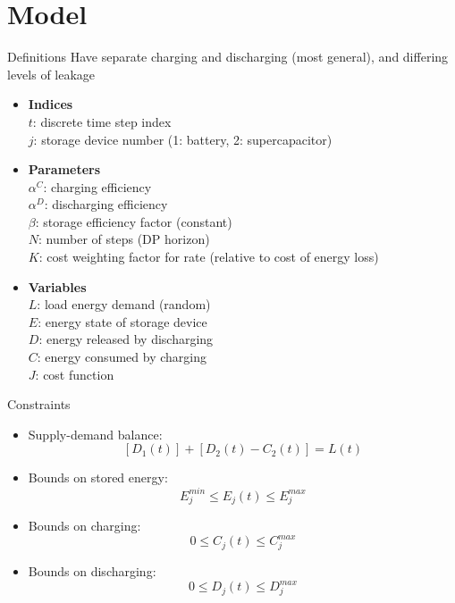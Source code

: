 \documentclass{beamer}
\begin{document}
\section{Model}

\begin{frame}{Definitions}
Have separate charging and discharging (most general), and differing levels of leakage
\begin{itemize}
	\item \textbf{Indices}\\
	$t$: discrete time step index\\
	$j$: storage device number (1: battery, 2: supercapacitor)\\
	\item \textbf{Parameters}\\
	$\alpha^{C}$: charging efficiency\\
	$\alpha^{D}$: discharging efficiency\\
	$\beta$: storage efficiency factor (constant)\\
	$N$: number of steps (DP horizon)\\
	$K$: cost weighting factor for rate (relative to cost of energy loss)\\
	\item \textbf{Variables}\\
	$L$: load energy demand (random)\\
	$E$: energy state of storage device\\
	$D$: energy released by discharging\\
	$C$: energy consumed by charging\\
	$J$: cost function

\end{itemize}
\end{frame}

\begin{frame}{Constraints}
\begin{itemize}
	\item Supply-demand balance: 
	\begin{equation} \label{eq:BalanceEqn}\left[D_{1}(t)\right] + \left[D_{2}(t) - C_{2}(t)\right] = L(t) \end{equation}
	
	\item Bounds on stored energy: 
	\begin{equation}E_{j}^{min}\leq E_{j}(t)\leq E_{j}^{max}\end{equation}
	\item Bounds on charging:
	\begin{equation}0\leq C_{j}(t)\leq C_{j}^{max}\end{equation}
	\item Bounds on discharging:
	\begin{equation}0\leq D_{j}(t)\leq D_{j}^{max}\end{equation}
\end{itemize}
\end{frame}
\end{document}
